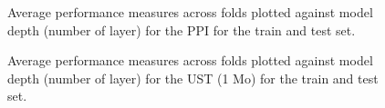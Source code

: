 \documentclass{article}
\theoremstyle{plain}
\theoremstyle{definition}
\theoremstyle{remark}
\begin{document}

\begin{figure}


\caption{\label{fig-ppi}Average performance measures across folds plotted against model depth (number of layer) for the PPI for the train and test set.}

\end{figure}%


\begin{figure}


\caption{\label{fig-ust-1}Average performance measures across folds plotted against model depth (number of layer) for the UST (1 Mo) for the train and test set.}

\end{figure}%

\end{document}
